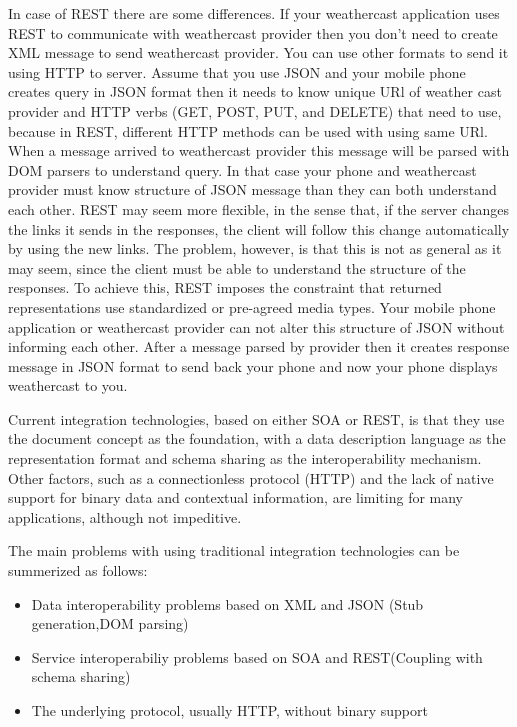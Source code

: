 In case of REST there are some differences. If your weathercast application uses REST to communicate with weathercast provider then you don’t need to create XML message to send weathercast provider. You can use other formats to send it using HTTP to server. Assume that you use JSON and your mobile phone creates query in JSON format then it needs to know unique URl of weather cast provider and HTTP verbs (GET, POST, PUT, and DELETE) that need to use, because in REST, different HTTP methods can be used with using same URl. When a message arrived to weathercast provider this message will be parsed with DOM parsers to understand query. In that case your phone and weathercast provider must know structure of JSON message than they can both understand each other. REST may seem more flexible, in the sense that, if the server changes the links it sends in the responses, the client will follow this change automatically by using the new links. The problem, however, is that this is not as general as it may seem, since the client must be able to understand the structure of the responses. To achieve this, REST imposes the constraint that returned representations use standardized or pre-agreed media types. Your mobile phone application or weathercast provider can not alter this structure of JSON without informing each other. After a message parsed by provider then it creates response message in JSON format to send back your phone and now your phone displays weathercast to you.

Current integration technologies, based on either SOA or REST, is that they use the document concept as the foundation, with a data description language as the representation format and schema sharing as the interoperability mechanism. Other factors, such as a connectionless protocol (HTTP) and the lack of native support for binary data and contextual information, are limiting for many applications, although not impeditive.

The main problems with using traditional integration technologies can be summerized as follows:
\begin{itemize}
  \item Data interoperability problems based on XML and JSON (Stub generation,DOM parsing)
  \item Service interoperabiliy problems based on SOA and REST(Coupling with schema sharing)
  \item The underlying protocol, usually HTTP, without binary support
\end{itemize}

